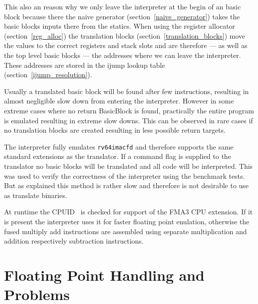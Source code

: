 \documentclass[course=eragp]{aspdoc}
\begin{document}
\par

This also an reason why we only leave the interpreter at the begin of an basic block because there
the naive generator (section~\ref{naive_generator}) takes the basic blocks inputs there from the statics.
When using the register allocator (section~\ref{reg_alloc}) the translation blocks
(section~\ref{translation_blocks}) move the values to the correct registers and stack slots and are
therefore --- as well as the top level basic blocks --- the addresses where we can leave the
interpreter. These addresses are stored in the ijump lookup table (section~\ref{ijump_resolution}).

\par

Usually a translated basic block will be found after few instructions, resulting in almost
negligible slow down from entering the interpreter. However in some extreme cases where no return
BasicBlock is found, practically the entire program is emulated resulting in extreme slow downs.
This can be observed in rare cases if no translation blocks are created resulting in less possible
return targets.

\par

The interpreter fully emulates \texttt{rv64imacfd} and therefore supports the same standard
extensions as the translator. If a command flag is supplied to the translator no
basic blocks will be translated and all code will be interpreted. This was used to verify the
correctness of the interpreter using the benchmark tests. But as explained this method is rather
slow and therefore is not desirable to use as translate binaries.

\par

At runtime the CPUID~\cite{intel2017man} is checked for support of the FMA3 CPU extension. If it is
present the interpreter uses it for faster floating point enulation, otherwise the fused multiply
add instructions are assembled using separate multiplication and addition respectively subtraction
instructions.

\par

\section{Floating Point Handling and Problems}\label{sec:floating_point}
\end{document}

